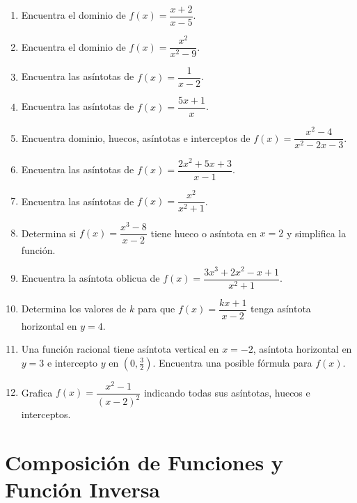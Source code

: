 \documentclass[12pt, letterpaper]{article}
\begin{document}
\begin{enumerate}[series=ejercicios, leftmargin=*]
  \item \facil{} Encuentra el dominio de $f(x) = \dfrac{x + 2}{x - 5}$.

  \item \facil{} Encuentra el dominio de $f(x) = \dfrac{x^2}{x^2 - 9}$.

  \item \facil{} Encuentra las asíntotas de $f(x) = \dfrac{1}{x - 2}$.

  \item \facil{} Encuentra las asíntotas de $f(x) = \dfrac{5x + 1}{x}$.

  \item \medio{} Encuentra dominio, huecos, asíntotas e interceptos de $f(x) = \dfrac{x^2 - 4}{x^2 - 2x - 3}$.

  \item \medio{} Encuentra las asíntotas de $f(x) = \dfrac{2x^2 + 5x + 3}{x - 1}$.

  \item \medio{} Encuentra las asíntotas de $f(x) = \dfrac{x^2}{x^2 + 1}$.

  \item \medio{} Determina si $f(x) = \dfrac{x^3 - 8}{x - 2}$ tiene hueco o asíntota en $x = 2$ y simplifica la función.

  \item \dificil{} Encuentra la asíntota oblicua de $f(x) = \dfrac{3x^3 + 2x^2 - x + 1}{x^2 + 1}$.

  \item \dificil{} Determina los valores de $k$ para que $f(x) = \dfrac{kx + 1}{x - 2}$ tenga asíntota horizontal en $y = 4$.

  \item \dificil{} Una función racional tiene asíntota vertical en $x = -2$, asíntota horizontal en $y = 3$ e intercepto $y$ en $(0, \frac{3}{2})$. Encuentra una posible fórmula para $f(x)$.

  \item \dificil{} Grafica $f(x) = \dfrac{x^2 - 1}{(x - 2)^2}$ indicando todas sus asíntotas, huecos e interceptos.
\end{enumerate}



\section{Composición de Funciones y Función Inversa}
\end{document}
